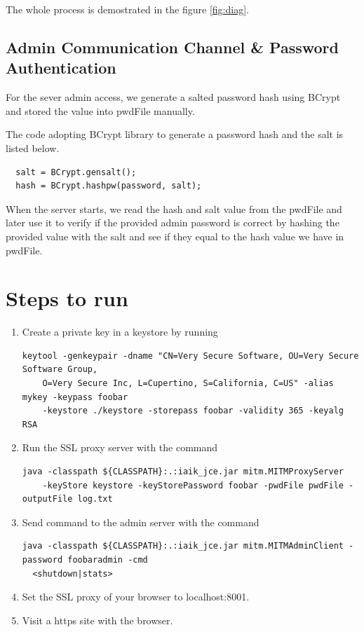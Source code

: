 The whole process is demostrated in the figure \ref{fig:diag}. 

\subsection{Admin Communication Channel \& Password Authentication} 
For the sever admin access, we generate a salted password hash using BCrypt and stored the value into pwdFile manually. 

The code adopting BCrypt library to generate a password hash and the salt is listed below. 
\begin{lstlisting}
  salt = BCrypt.gensalt();
  hash = BCrypt.hashpw(password, salt);
\end{lstlisting}

When the server starts, we read the hash and salt value from the pwdFile and later use it to verify if the provided admin password is correct by hashing the provided value with the salt and see if they equal to the hash value we have in pwdFile. 


\section{Steps to run}
\begin{enumerate}[(1)]
  \item Create a private key in a keystore by running 

\begin{lstlisting} 
keytool -genkeypair -dname "CN=Very Secure Software, OU=Very Secure Software Group, 
    O=Very Secure Inc, L=Cupertino, S=California, C=US" -alias mykey -keypass foobar 
    -keystore ./keystore -storepass foobar -validity 365 -keyalg RSA
\end{lstlisting}

\item Run the SSL proxy server with the command 
\begin{lstlisting}
java -classpath ${CLASSPATH}:.:iaik_jce.jar mitm.MITMProxyServer 
    -keyStore keystore -keyStorePassword foobar -pwdFile pwdFile -outputFile log.txt
\end{lstlisting}

\item Send command to the admin server with the command 
\begin{lstlisting}
java -classpath ${CLASSPATH}:.:iaik_jce.jar mitm.MITMAdminClient -password foobaradmin -cmd 
  <shutdown|stats>
\end{lstlisting}


\item Set the SSL proxy of your browser to localhost:8001.
\item Visit a https site with the browser.
\end{enumerate}


